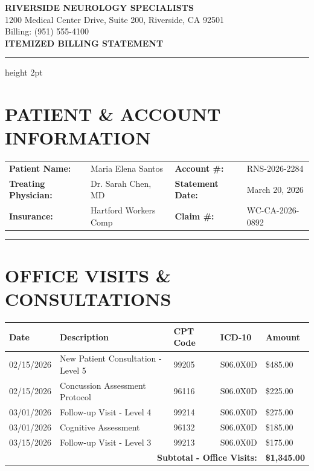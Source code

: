 \documentclass[11pt]{article}
\begin{document}
\begin{center}
{\Large\bfseries\color{medblue} RIVERSIDE NEUROLOGY SPECIALISTS}\\[0.3em]
{\small 1200 Medical Center Drive, Suite 200, Riverside, CA 92501}\\
{\small Billing: (951) 555-4100}\\[1em]
{\LARGE\bfseries ITEMIZED BILLING STATEMENT}
\end{center}

\vspace{0.5em}
\hrule height 2pt
\vspace{1em}

\section*{PATIENT \& ACCOUNT INFORMATION}

\begin{tabular}{@{}p{4cm}p{5cm}p{3.5cm}p{4cm}@{}}
\textbf{Patient Name:} & Maria Elena Santos & \textbf{Account \#:} & RNS-2026-2284 \\
\textbf{Treating Physician:} & Dr. Sarah Chen, MD & \textbf{Statement Date:} & March 20, 2026 \\
\textbf{Insurance:} & Hartford Workers Comp & \textbf{Claim \#:} & WC-CA-2026-0892 \\
\end{tabular}

\vspace{1em}
\hrule
\vspace{1em}

\section*{OFFICE VISITS \& CONSULTATIONS}

\begin{longtable}{@{}p{2cm}p{6cm}p{2cm}p{2cm}p{2.5cm}@{}}
\toprule
\textbf{Date} & \textbf{Description} & \textbf{CPT Code} & \textbf{ICD-10} & \textbf{Amount} \\
\midrule
\endhead

02/15/2026 & New Patient Consultation - Level 5 & 99205 & S06.0X0D & \$485.00 \\
02/15/2026 & Concussion Assessment Protocol & 96116 & S06.0X0D & \$225.00 \\
03/01/2026 & Follow-up Visit - Level 4 & 99214 & S06.0X0D & \$275.00 \\
03/01/2026 & Cognitive Assessment & 96132 & S06.0X0D & \$185.00 \\
03/15/2026 & Follow-up Visit - Level 3 & 99213 & S06.0X0D & \$175.00 \\
\midrule
\multicolumn{4}{r}{\textbf{Subtotal - Office Visits:}} & \textbf{\$1,345.00} \\
\bottomrule
\end{longtable}
\end{document}
